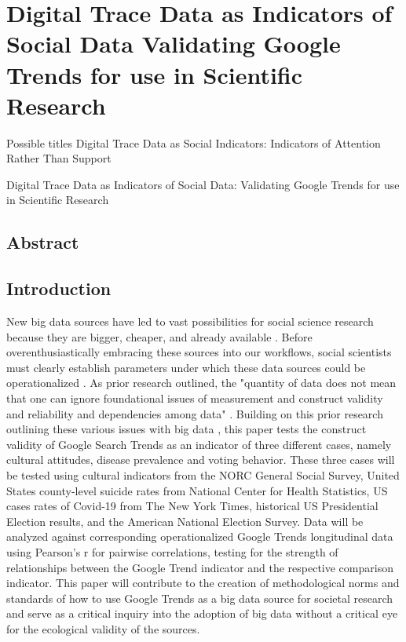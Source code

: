 \hypertarget{paper-1}{%
\chapter{Digital Trace Data as Indicators of Social Data Validating Google Trends for  use in Scientific Research}\label{paper-1}}

Possible titles Digital Trace Data as Social Indicators: Indicators of
Attention Rather Than Support

Digital Trace Data as Indicators of Social Data: Validating Google Trends for
 use in Scientific Research


\section{Abstract}

\section{Introduction}
New big data sources have led to vast possibilities for social science
research because they are bigger, cheaper, and already available
\citep{kingEnsuringDataRichFuture2011, lazerComputationalSocialScience2009,
salganikBitBitSocial2017}. Before overenthusiastically embracing these
sources into our workflows, social scientists must clearly establish
parameters under which these data sources could be operationalized
\citep{bailCulturalEnvironmentMeasuring2014, lazerParableGoogleFlu2014}. As
prior research outlined, the "quantity of data does not mean that one
can ignore foundational issues of measurement and construct validity and
reliability and dependencies among data" \citep[p. 1203]{lazerParableGoogleFlu2014}. Building on this prior research outlining these various
issues with big data \citep{boydCriticalQuestionsBig2012,
lazerIssuesConstructValidity2015}, this paper tests the construct
validity of Google Search Trends as an indicator of three different
cases, namely cultural attitudes, disease prevalence and voting
behavior. These three cases will be tested using cultural indicators
from the NORC General Social Survey, United States county-level suicide
rates from National Center for Health Statistics, US cases rates of
Covid-19 from The New York Times, historical US Presidential Election
results, and the American National Election Survey. Data will be
analyzed against corresponding operationalized Google Trends
longitudinal data using Pearson's r for pairwise correlations, testing
for the strength of relationships between the Google Trend indicator and
the respective comparison indicator. This paper will contribute to the
creation of methodological norms and standards of how to use Google
Trends as a big data source for societal research and serve as a
critical inquiry into the adoption of big data without a critical eye
for the ecological validity of the sources.

